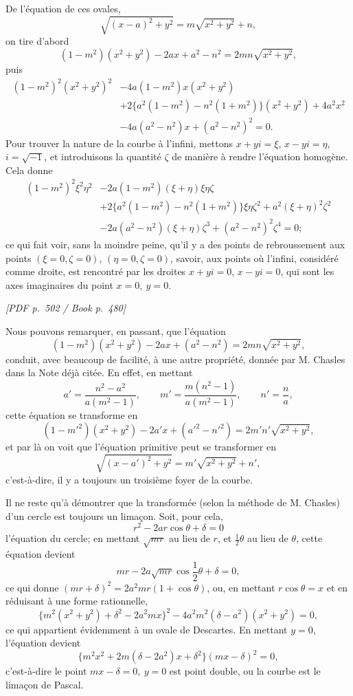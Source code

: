 \documentclass[11pt]{article}
\newcommand{\Page}[2]{\bigskip\noindent\textit{[PDF p.~#1 / Book p.~#2]}\par\smallskip}
\begin{document}
De l'\'equation de ces ovales,
\[
        \sqrt{(x-a)^2+y^2}=m\sqrt{x^2+y^2}+n,
\]
on tire d'abord
\[
        (1-m^2)(x^2+y^2)-2ax+a^2-n^2=2mn\sqrt{x^2+y^2},
\]
puis
\[
\begin{aligned}
(1-m^2)^2(x^2+y^2)^2&-4a(1-m^2)x(x^2+y^2)\\
&+2\{a^2(1-m^2)-n^2(1+m^2)\}(x^2+y^2)
  +4a^2x^2\\
&-4a(a^2-n^2)x+(a^2-n^2)^2=0.
\end{aligned}
\]
Pour trouver la nature de la courbe \`a l'infini, mettons $x+yi=\xi$,
$x-yi=\eta$, $i=\sqrt{-1}$, et introduisons la quantit\'e $\zeta$ de mani\`ere \`a
rendre l'\'equation homog\`ene. Cela donne
\[
\begin{aligned}
(1-m^2)^2\xi^2\eta^2
&-2a(1-m^2)(\xi+\eta)\xi\eta\zeta\\
&+2\{a^2(1-m^2)-n^2(1+m^2)\}\xi\eta\zeta^2
  +a^2(\xi+\eta)^2\zeta^2\\
&-2a(a^2-n^2)(\xi+\eta)\zeta^3+(a^2-n^2)^2\zeta^4=0;
\end{aligned}
\]
ce qui fait voir, sans la moindre peine, qu'il y a des points de rebroussement aux
points $(\xi=0,\zeta=0)$, $(\eta=0,\zeta=0)$, savoir, aux points o\`u l'infini,
consid\'er\'e comme droite, est rencontr\'e par les droites $x+yi=0$, $x-yi=0$,
qui sont les axes imaginaires du point $x=0,\ y=0$.

\Page{502}{480}

Nous pouvons remarquer, en passant, que l'\'equation
\[
        (1-m^2)(x^2+y^2)-2ax+(a^2-n^2)=2mn\sqrt{x^2+y^2},
\]
conduit, avec beaucoup de facilit\'e, \`a une autre propri\'et\'e, donn\'ee par M. Chasles
dans la Note d\'ej\`a cit\'ee. En effet, en mettant
\[
        a'=\frac{n^2-a^2}{a(m^2-1)},\qquad
        m'=\frac{m(n^2-1)}{a(m^2-1)},\qquad
        n'=\frac{n}{a},
\]
cette \'equation se transforme en
\[
        (1-m'^2)(x^2+y^2)-2a'x+(a'^2-n'^2)=2m'n'\sqrt{x^2+y^2},
\]
et par l\`a on voit que l'\'equation primitive peut se transformer en
\[
        \sqrt{(x-a')^2+y^2}=m'\sqrt{x^2+y^2}+n',
\]
c'est-\`a-dire, il y a toujours un troisi\`eme foyer de la courbe.

Il ne reste qu'\`a d\'emontrer que la transform\'ee (selon la m\'ethode de M. Chasles)
d'un cercle est toujours un lima\c{c}on. Soit, pour cela,
\[
        r^2-2ar\cos\theta+\delta=0
\]
l'\'equation du cercle; en mettant $\sqrt{mr}$ au lieu de $r$, et $\frac12\theta$ au
lieu de $\theta$, cette \'equation devient
\[
        mr-2a\sqrt{mr}\cos\frac12\theta+\delta=0,
\]
ce qui donne $(mr+\delta)^2=2a^2mr(1+\cos\theta)$, ou, en mettant
$r\cos\theta=x$ et en r\'eduisant \`a une forme rationnelle,
\[
        \{m^2(x^2+y^2)+\delta^2-2a^2mx\}^2
        -4a^2m^2(\delta-a^2)(x^2+y^2)=0,
\]
ce qui appartient \'evidemment \`a un ovale de Descartes. En mettant $y=0$,
l'\'equation devient
\[
        \{m^2x^2+2m(\delta-2a^2)x+\delta^2\}(mx-\delta)^2=0,
\]
c'est-\`a-dire le point $mx-\delta=0,\ y=0$ est point double, ou la courbe est le
lima\c{c}on de Pascal.
\end{document}
